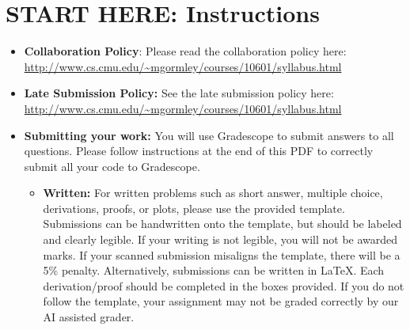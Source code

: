 \documentclass[11pt,addpoints,answers]{exam}
\newcommand{\homeworktype}{\string written}
\begin{document}
\section*{START HERE: Instructions}
\begin{itemize}

\item \textbf{Collaboration Policy}: Please read the collaboration policy here: \url{http://www.cs.cmu.edu/~mgormley/courses/10601/syllabus.html}

\item\textbf{Late Submission Policy:} See the late submission policy here: \url{http://www.cs.cmu.edu/~mgormley/courses/10601/syllabus.html}

\item\textbf{Submitting your work:} You will use Gradescope to submit
  answers to all questions\ifthenelse{\equal{\homeworktype}{\string written}}{}{ and code}. Please
  follow instructions at the end of this PDF to correctly submit all your code to Gradescope.

  \begin{itemize}
    

    
   \item \textbf{Written:} For written problems such as short answer, multiple choice, derivations, proofs, or plots, please use the provided template. Submissions can be handwritten onto the template, but should be labeled and clearly legible. If your writing is not legible, you will not be awarded marks. If your scanned submission misaligns the template, there will be a 5\% penalty. Alternatively, submissions can be written in LaTeX. 
   Each derivation/proof should be completed in the boxes provided. If you do not follow the template, your assignment may not be graded correctly by our AI assisted grader.


\end{itemize}
\end{itemize}
\end{document}
